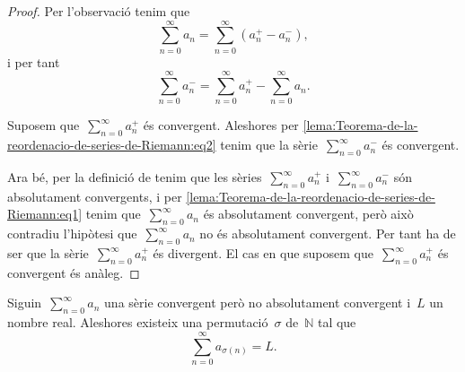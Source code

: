 \documentclass[../../main.tex]{subfiles}
\begin{document}
    \begin{proof}
        Per l'observació  tenim que
        \begin{equation}
            \label{lema:Teorema-de-la-reordenacio-de-series-de-Riemann:eq1}
            \sum_{n=0}^{\infty}a_{n}=\sum_{n=0}^{\infty}\left(a^{+}_{n}-a^{-}_{n}\right),
        \end{equation}
        i per tant
        \begin{equation}
            \label{lema:Teorema-de-la-reordenacio-de-series-de-Riemann:eq2}
            \sum_{n=0}^{\infty}a^{-}_{n}=\sum_{n=0}^{\infty}a^{+}_{n}-\sum_{n=0}^{\infty}a_{n}.
        \end{equation}

        Suposem que~\(\sum_{n=0}^{\infty}a^{+}_{n}\) és convergent.
        Aleshores per \eqref{lema:Teorema-de-la-reordenacio-de-series-de-Riemann:eq2} tenim que la sèrie~\(\sum_{n=0}^{\infty}a^{-}_{n}\) és convergent.

        Ara bé, per la definició de  tenim que les sèries~\(\sum_{n=0}^{\infty}a^{+}_{n}\) i~\(\sum_{n=0}^{\infty}a^{-}_{n}\) són absolutament convergents, i per \eqref{lema:Teorema-de-la-reordenacio-de-series-de-Riemann:eq1} tenim que~\(\sum_{n=0}^{\infty}a_{n}\) és absolutament convergent, però això contradiu l'hipòtesi que~\(\sum_{n=0}^{\infty}a_{n}\) no és absolutament convergent.
        Per tant ha de ser que la sèrie~\(\sum_{n=0}^{\infty}a^{+}_{n}\) és divergent.
        El cas en que suposem que~\(\sum_{n=0}^{\infty}a^{+}_{n}\) és convergent és anàleg.
    \end{proof}
    \begin{theorem}
        \label{thm:Teorema-de-la-reordenacio-de-series-de-Riemann}
        Siguin~\(\sum_{n=0}^{\infty}a_{n}\) una sèrie convergent però no absolutament convergent i~\(L\) un nombre real.
        Aleshores existeix una permutació~\(\sigma\) de~\(\mathbb{N}\) tal que
        \[
            \sum_{n=0}^{\infty}a_{\sigma(n)}=L.
        \]
    \end{theorem}
\end{document}
